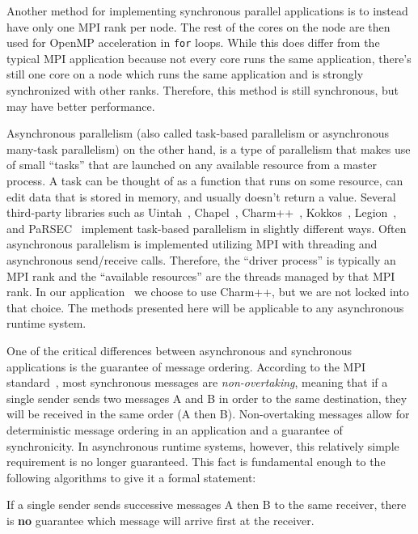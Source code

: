 \begin{bibunit}[unsrtnat]
Another method for implementing synchronous parallel applications is to instead
have only one MPI rank per node. The rest of the cores on the node are then used
for OpenMP acceleration in \texttt{for} loops. While this does differ from the
typical MPI application because not every core runs the same application,
there's still one core on a node which runs the same application and is strongly
synchronized with other ranks. Therefore, this method is still synchronous,
but may have better performance.

Asynchronous parallelism (also called task-based parallelism or asynchronous
many-task parallelism) on the other hand, is a type of parallelism that makes
use of small ``tasks'' that are launched on any available resource from a master
process. A task can be thought of as a function that runs on some resource, can
edit data that is stored in memory, and usually doesn't return a value. Several
third-party libraries such as Uintah~\cite{10.5555/822085.823309},
Chapel~\cite{10.5555/2753024.2753030},
Charm++~\cite{laxmikant_kale_2020_3972617}, Kokkos~\cite{kokkos},
Legion~\cite{7529975}, and
PaRSEC~\cite{chevalier2019protocolasynchronousreliablesecure} implement
task-based parallelism in slightly different ways. Often asynchronous
parallelism is implemented utilizing MPI with threading and asynchronous
send/receive calls. Therefore, the ``driver process'' is typically an MPI rank
and the ``available resources'' are the threads managed by that MPI rank. In our
application \spectre~we choose to use Charm++, but we are not locked into that
choice. The methods presented here will be applicable to any asynchronous
runtime system.

One of the critical differences between asynchronous and synchronous
applications is the guarantee of message ordering. According to the MPI
standard~\cite{mpi50}, most synchronous messages are \textit{non-overtaking},
meaning that if a single sender sends two messages A and B in order to the same
destination, they will be received in the same order (A then B). Non-overtaking
messages allow for deterministic message ordering in an application and a
guarantee of synchronicity. In asynchronous runtime systems, however, this
relatively simple requirement is no longer guaranteed. This fact is fundamental
enough to the following algorithms to give it a formal statement:

\begin{statement}
  \label{statement:a_before_b}
  If a single sender sends successive messages A then B to the same receiver,
  there is \textbf{no} guarantee which message will arrive first at the
  receiver.
\end{statement}


\end{bibunit}
